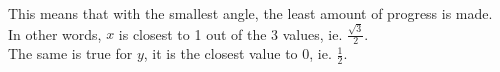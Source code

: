 \documentclass[preview]{standalone}
\begin{document}
\begin{center}
This means that with the smallest angle, the least amount of progress is made. \\ In other words, $x$ is closest to 1 out of the 3 values, ie. $ \frac{\sqrt{3}}{2} $. \\ The same is true for $y$, it is the closest value to 0, ie. $\frac{1}{2}.$
\end{center}
\end{document}
